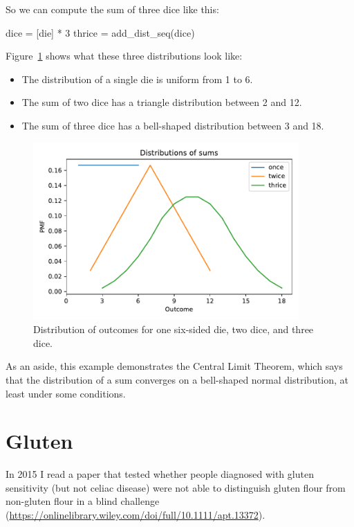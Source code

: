 \documentclass[12pt]{book}
\theoremstyle{exercise}
\begin{document}
So we can compute the sum of three dice like this:

\begin{code}
dice = [die] * 3
thrice = add_dist_seq(dice)
\end{code}

Figure~\ref{fig05-01} shows what these three distributions look like:

\begin{itemize}

\item The distribution of a single die is uniform from 1 to 6.

\item The sum of two dice has a triangle distribution between 2 and 12.

\item The sum of three dice has a bell-shaped distribution between 3 and 18.

\end{itemize}

\begin{figure}
\centerline{\includegraphics[width=4in]{figs/fig05-01.pdf}}
\caption{Distribution of outcomes for one six-sided die, two dice, and three dice.}
\label{fig05-01}
\end{figure}

As an aside, this example demonstrates the Central Limit Theorem, which says that the distribution of a sum converges on a bell-shaped normal distribution, at least under some conditions.

\section{Gluten}

In 2015 I read a paper that tested whether people diagnosed with gluten sensitivity (but not celiac disease) were not able to distinguish gluten flour from non-gluten flour in a blind challenge (\url{https://onlinelibrary.wiley.com/doi/full/10.1111/apt.13372}).
\end{document}
